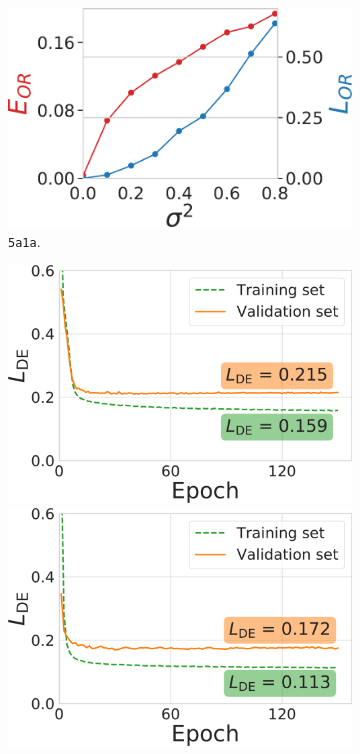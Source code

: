 \begin{figure}
\begin{minipage}[b]{0.48\linewidth}
\begin{subfigure}[b]{0.49\linewidth}
        \centering
            \includegraphics[width=\linewidth]{figures/5a1a_perfect_noisy_ar_aa}
            \caption{\texttt{5a1a}.}
        \end{subfigure}
        \caption{%
            Orientation recovery from perturbed distances.
        }\label{fig:perfect-with-noise-ar-aa}
    \end{minipage}
    \hfill
    \begin{minipage}[b]{0.45\linewidth}
        \begin{subfigure}[b]{\linewidth}
            \centering
            \includegraphics[width=0.47\linewidth]{figures/de_5j0n_fullcov_uniformS2.pdf}
            \hfill
            \includegraphics[width=0.47\linewidth]{figures/de_5a1a_last.pdf}  %

\end{subfigure}
\end{minipage}
\end{figure}
